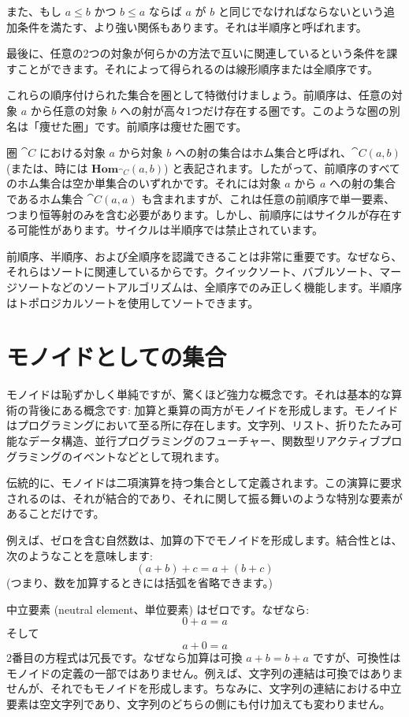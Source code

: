 また、もし \(a \leqslant b\) かつ \(b \leqslant a\) ならば \(a\) が \(b\) と同じでなければならないという追加条件を満たす、より強い関係もあります。それは半順序と呼ばれます。

最後に、任意の2つの対象が何らかの方法で互いに関連しているという条件を課すことができます。それによって得られるのは線形順序または全順序です。

これらの順序付けられた集合を圏として特徴付けましょう。前順序は、任意の対象 \(a\) から任意の対象 \(b\) への射が高々1つだけ存在する圏です。このような圏の別名は「痩せた圏」です。前順序は痩せた圏です。

圏 \(\cat{C}\) における対象 \(a\) から対象 \(b\) への射の集合はホム集合と呼ばれ、\(\cat{C}(a, b)\) (または、時には \(\mathbf{Hom}_{\cat{C}}(a, b)\)) と表記されます。したがって、前順序のすべてのホム集合は空か単集合のいずれかです。それには対象 \(a\) から \(a\) への射の集合であるホム集合 \(\cat{C}(a, a)\) も含まれますが、これは任意の前順序で単一要素、つまり恒等射のみを含む必要があります。しかし、前順序にはサイクルが存在する可能性があります。サイクルは半順序では禁止されています。

前順序、半順序、および全順序を認識できることは非常に重要です。なぜなら、それらはソートに関連しているからです。クイックソート、バブルソート、マージソートなどのソートアルゴリズムは、全順序でのみ正しく機能します。半順序はトポロジカルソートを使用してソートできます。

\section{モノイドとしての集合}

モノイドは恥ずかしく単純ですが、驚くほど強力な概念です。それは基本的な算術の背後にある概念です: 加算と乗算の両方がモノイドを形成します。モノイドはプログラミングにおいて至る所に存在します。文字列、リスト、折りたたみ可能なデータ構造、並行プログラミングのフューチャー、関数型リアクティブプログラミングのイベントなどとして現れます。

伝統的に、モノイドは二項演算を持つ集合として定義されます。この演算に要求されるのは、それが結合的であり、それに関して振る舞いのような特別な要素があることだけです。

例えば、ゼロを含む自然数は、加算の下でモノイドを形成します。結合性とは、次のようなことを意味します: 
\[(a + b) + c = a + (b + c)\]
 (つまり、数を加算するときには括弧を省略できます。) 

中立要素 (neutral element、単位要素) はゼロです。なぜなら: 
\[0 + a = a\]
そして
\[a + 0 = a\]
2番目の方程式は冗長です。なぜなら加算は可換 \(a + b = b + a\) ですが、可換性はモノイドの定義の一部ではありません。例えば、文字列の連結は可換ではありませんが、それでもモノイドを形成します。ちなみに、文字列の連結における中立要素は空文字列であり、文字列のどちらの側にも付け加えても変わりません。

